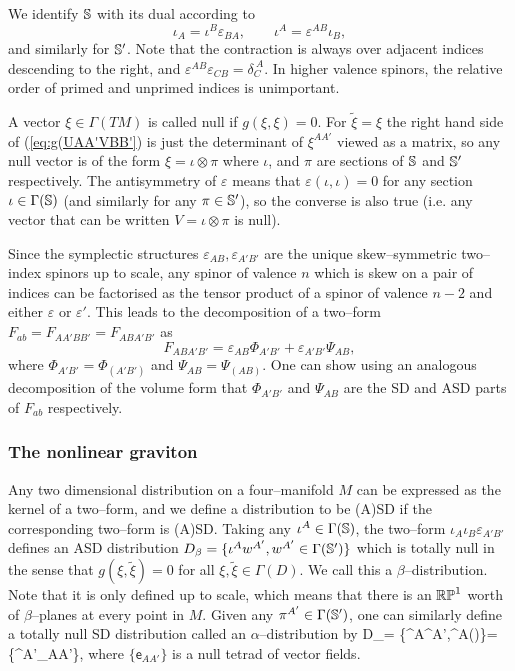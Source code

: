 We identify $\mathbb{S}$ with its dual according to
\[
\iota_A=\iota^B\varepsilon_{BA},\qquad \iota^A=\varepsilon^{AB}\iota_B,
\]
and similarly for $\mathbb{S}'$. Note that the contraction is always over adjacent indices descending to the right, and $\varepsilon^{AB}\varepsilon_{CB}=\delta_C^{\ A}$. In higher valence spinors, the relative order of primed and unprimed indices is unimportant.

A vector $\xi\in \Gamma(TM)$ is called null if $g(\xi, \xi)=0$. For $\tilde{\xi}=\xi$ the right hand side of (\ref{eq:g(UAA'VBB'}) is just the determinant of $\xi^{AA'} $ viewed as a matrix, so any null vector is of the form
$\xi=\iota \otimes \pi$ where $\iota$, and $\pi$ are sections of
$\mathbb{S}$ and $\mathbb{S}'$ respectively. The antisymmetry of $\varepsilon$ means that $\varepsilon(\iota,\iota)=0$ for any section $\iota\in\Gamma(\mathbb{S})$ (and similarly for any $\pi\in\mathbb{S}'$), so the converse is also true (i.e. any vector that can be written $V=\iota\otimes \pi$ is null).

Since the symplectic structures $\varepsilon_{AB},\varepsilon_{A'B'}$ are the unique skew--symmetric two--index spinors up to scale, any spinor of valence $n$ which is skew on a pair of indices can be factorised as the tensor product of a spinor of valence $n-2$ and either $\varepsilon$ or $\varepsilon'$. This leads to the decomposition of a two--form $F_{ab}=F_{AA'BB'}=F_{ABA'B'}$ as
\[
F_{ABA'B'} = \varepsilon_{AB}\Phi_{A'B'} + \varepsilon_{A'B'}\Psi_{AB},
\]
where $\Phi_{A'B'}=\Phi_{(A'B')}$ and $\Psi_{AB}=\Psi_{(AB)}$. One can show using an analogous decomposition of the volume form that $\Phi_{A'B'}$ and $\Psi_{AB}$ are the SD and ASD parts of $F_{ab}$ respectively.

\subsubsection{The nonlinear graviton}
Any two dimensional distribution on a four--manifold $M$ can be expressed as the kernel of a two--form, and we define a distribution to be (A)SD if the corresponding two--form is (A)SD. Taking any $\iota^A\in\Gamma(\mathbb{S})$, the two--form $\iota_A\iota_B\varepsilon_{A'B'}$ defines an ASD distribution $D_\beta=\{\iota^Aw^{A'},w^{A'}\in\Gamma(\mathbb{S}')\}$ which is totally null in the sense that $g(\xi,\tilde{\xi})=0$ for all $\xi,\tilde{\xi}\in\Gamma(D)$. We call this a $\beta$--distribution. Note that it is only defined up to scale, which means that there is an $\mathbb{RP}^1$ worth of $\beta$--planes at every point in $M$. Given any $\pi^{A'}\in\Gamma(\mathbb{S}')$, one can similarly define a totally null SD distribution called an $\alpha$--distribution by
\be \label{eq:alpha_dist}
D_\alpha = \{\iota^A\pi^{A'},\iota^{A}\in\Gamma(\spp)\}=\{\pi^{A'}_{AA'}\},
\ee
where $\{\mathsf{e}_{AA'}\}$ is a null tetrad of vector fields.

